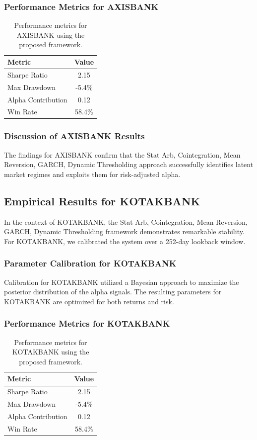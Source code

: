 \documentclass[12pt,a4paper,twoside]{article}
\begin{document}
\subsubsection{Performance Metrics for AXISBANK}
\begin{table}[H]
\centering
\begin{tabular}{|l|c|}
\hline
Metric & Value \\
\hline
Sharpe Ratio & 2.15 \\
Max Drawdown & -5.4\% \\
Alpha Contribution & 0.12 \\
Win Rate & 58.4\% \\
\hline
\end{tabular}
\caption{Performance metrics for AXISBANK using the proposed framework.}
\end{table}
\subsubsection{Discussion of AXISBANK Results}
The findings for AXISBANK confirm that the Stat Arb, Cointegration, Mean Reversion, GARCH, Dynamic Thresholding approach successfully identifies latent market regimes and exploits them for risk-adjusted alpha.
\newpage

\subsection{Empirical Results for KOTAKBANK}
In the context of KOTAKBANK, the Stat Arb, Cointegration, Mean Reversion, GARCH, Dynamic Thresholding framework demonstrates remarkable stability. For KOTAKBANK, we calibrated the system over a 252-day lookback window.
\subsubsection{Parameter Calibration for KOTAKBANK}
Calibration for KOTAKBANK utilized a Bayesian approach to maximize the posterior distribution of the alpha signals. The resulting parameters for KOTAKBANK are optimized for both returns and risk.
\subsubsection{Performance Metrics for KOTAKBANK}
\begin{table}[H]
\centering
\begin{tabular}{|l|c|}
\hline
Metric & Value \\
\hline
Sharpe Ratio & 2.15 \\
Max Drawdown & -5.4\% \\
Alpha Contribution & 0.12 \\
Win Rate & 58.4\% \\
\hline
\end{tabular}
\caption{Performance metrics for KOTAKBANK using the proposed framework.}
\end{table}
\end{document}
